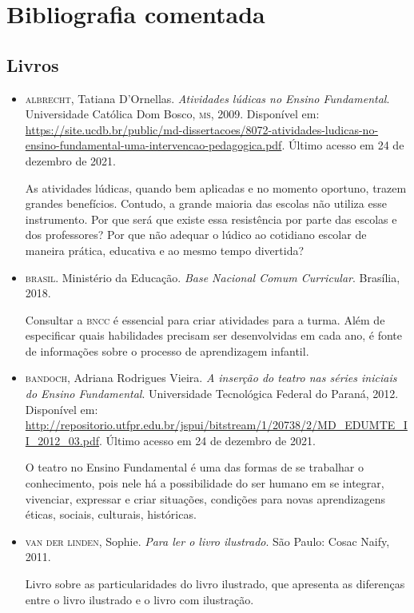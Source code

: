 \documentclass[11pt]{extarticle}
\begin{document}
\section{Bibliografia comentada}

\subsection{Livros}

\begin{itemize}

	\item \textsc{albrecht}, Tatiana D'Ornellas. \textit{Atividades lúdicas no Ensino Fundamental}. Universidade Católica Dom Bosco, \textsc{ms}, 2009. Disponível em: \url{https://site.ucdb.br/public/md-dissertacoes/8072-atividades-ludicas-no-ensino-fundamental-uma-intervencao-pedagogica.pdf}. Último acesso em 24 de dezembro de 2021.

	As atividades lúdicas, quando bem aplicadas e no momento oportuno, trazem
grandes benefícios. Contudo, a grande maioria das escolas não utiliza esse instrumento. Por
que será que existe essa resistência por parte das escolas e dos professores? Por que não
adequar o lúdico ao cotidiano escolar de maneira prática, educativa e ao mesmo tempo
divertida?

\item \textsc{brasil}. Ministério da Educação. \textit{Base Nacional Comum Curricular}. Brasília, 2018.

Consultar a \textsc{bncc} é essencial para criar atividades para a turma. Além de especificar 
quais habilidades precisam ser desenvolvidas em cada ano, é fonte de informações sobre 
o processo de aprendizagem infantil. 

 \item \textsc{bandoch}, Adriana Rodrigues Vieira. \textit{A inserção do teatro nas séries iniciais do Ensino Fundamental}.
 Universidade Tecnológica Federal do Paraná, 2012. Disponível em: \url{http://repositorio.utfpr.edu.br/jspui/bitstream/1/20738/2/MD_EDUMTE_II_2012_03.pdf}. Último acesso em 24 de dezembro de 2021.

	O teatro no Ensino Fundamental é uma das formas de se trabalhar o conhecimento,
pois nele há a possibilidade do ser humano em se integrar, vivenciar, expressar e
criar situações, condições para novas aprendizagens éticas, sociais, culturais,
históricas.


\item \textsc{van der linden}, Sophie. \textit{Para ler o livro ilustrado}. São Paulo: Cosac Naify, 2011.

Livro sobre as particularidades do livro ilustrado, que apresenta as diferenças entre o livro ilustrado e o livro com ilustração. 
\end{itemize}
\end{document}
